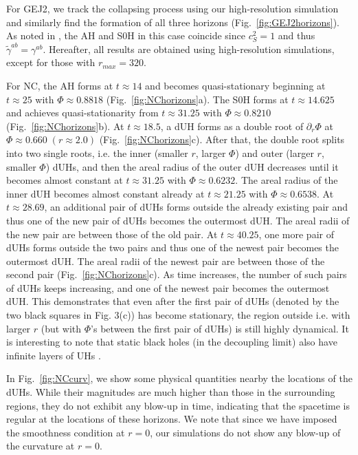 \documentclass[aps,preprintnumbers,twocolumn,showpacs]{revtex4-1}
\begin{document}
For GEJ2, we track the collapsing process using our high-resolution simulation and similarly find the formation of all three horizons (Fig.~\ref{fig:GEJ2horizons}). As noted in   \cite{GEJ07}, the AH and S0H in this case coincide since $c_S^2=1$ and thus $\tilde{\gamma}^{ab}=\gamma^{ab}$. Hereafter, all results are obtained using high-resolution simulations, except for those with $r_{max}=320$.

For  NC, the AH forms at $t\approx 14$ and becomes quasi-stationary beginning at $t\approx 25$ with $\Phi\approx 0.8818$ (Fig.~\ref{fig:NChorizons}a). The S0H forms at $t\approx 14.625$ and achieves quasi-stationarity from $t\approx 31.25$ with $\Phi\approx 0.8210$ (Fig.~\ref{fig:NChorizons}b).  At $t\approx 18.5$, a dUH forms as a double root of $\partial_r\Phi$ at  $\Phi \approx 0.660\; (r \approx 2.0)$ (Fig.~\ref{fig:NChorizons}c). After that, the double root splits into two single roots, i.e. the inner (smaller $r$, larger $\Phi$) and outer (larger $r$, smaller $\Phi$) dUHs, and then the areal radius of the outer dUH decreases until it becomes almost constant at $t\approx 31.25$ with $\Phi\approx 0.6232$. The areal radius of the inner dUH becomes almost constant already at $t\approx 21.25$ with $\Phi\approx 0.6538$. At $t\approx 28.69$, an additional pair of dUHs forms outside the already existing pair and thus one of the new pair of dUHs becomes the outermost dUH. The areal radii of the new pair are between those of the old pair. At $t\approx 40.25$,  one more pair of dUHs forms outside the two pairs and thus one of the newest pair becomes the outermost dUH. The areal radii of the newest pair are between those of the second pair (Fig.~\ref{fig:NChorizons}c). As time increases, the number of such pairs of dUHs keeps increasing, and one of the newest pair becomes the outermost dUH. This demonstrates that even after the first pair of dUHs (denoted by the two black squares in Fig. 3(c)) has become stationary, the region {outside i.e. with larger $r$ (but with $\Phi$'s between the first pair of dUHs)} is still highly dynamical. It is interesting to note that  static black holes  (in the decoupling limit) also have  infinite layers of UHs \cite{BS11}. 

In Fig.~\ref{fig:NCcurv}, we show some physical quantities nearby the locations of the dUHs. While their magnitudes are much higher than those in the surrounding regions, they do not exhibit any blow-up in time, indicating that the spacetime is regular at the locations of these horizons. We note that since we have imposed the smoothness condition at $r=0$, our simulations do not show any blow-up of the curvature at $r=0$. 
\end{document}
